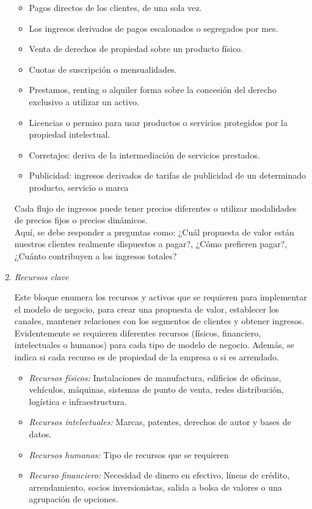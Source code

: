 \documentclass[10pt,a4paper]{article}
\begin{document}
\begin{multicols}{2}
\begin{enumerate}[1.]
				\begin{itemize}
					\item Pagos directos de los clientes, de una sola vez.
					\item Los ingresos derivados de pagos escalonados o segregados por mes.
					\item Venta de derechos de propiedad sobre un producto físico.
					\item Cuotas de suscripción o mensualidades.
					\item Prestamos, renting o alquiler forma sobre la concesión del derecho exclusivo a utilizar un activo.
					\item Licencias o permiso para usar productos o servicios protegidos por la propiedad intelectual.
					\item Corretajes: deriva de la intermediación de servicios prestados.
					\item Publicidad: ingresos derivados de tarifas de publicidad de un determinado producto, servicio o marca
				\end{itemize}
			Cada flujo de ingresos puede tener precios diferentes o utilizar modalidades de precios fijos o precios dinámicos.\\
			
			Aquí, se debe responder a preguntas como: ¿Cuál propuesta de valor están nuestros clientes realmente dispuestos a pagar?, ¿Cómo prefieren pagar?, ¿Cuánto contribuyen a los ingresos totales?
			
			\item \textit{Recursos clave}
			
			Este bloque enumera los recursos y activos que se requieren para implementar el modelo de negocio, para crear una propuesta de valor, establecer los canales, mantener relaciones con los segmentos de clientes y obtener ingresos.\\
			
			Evidentemente se requieren diferentes recursos (físicos, financiero, intelectuales o humanos) para cada tipo de modelo de negocio. Además, se indica si cada recurso es de propiedad de la empresa o si es arrendado.	
				\begin{itemize}
					\item \textit{Recursos físicos:} Instalaciones de manufactura, edificios de oficinas, vehículos, máquinas, sistemas de punto de venta, redes distribución, logística e infraestructura.
					\item \textit{Recursos intelectuales:} Marcas, patentes, derechos de autor y bases de datos.
					\item \textit{Recursos humanos:} Tipo de recursos que se requieren
					\item \textit{ Recurso financiero:} Necesidad de dinero en efectivo, líneas de crédito, arrendamiento, socios inversionistas, salida a bolsa de valores o una agrupación de opciones.
				\end{itemize}
			

\end{enumerate}
\end{multicols}
\end{document}
